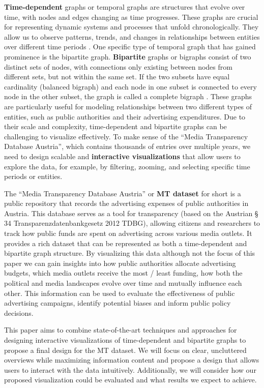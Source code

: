 \documentclass{vgtc}                          %
\begin{document}
\textbf{Time-dependent} graphs or temporal graphs are structures that evolve over time, with nodes and edges changing as time progresses. These graphs are crucial for representing dynamic systems and processes that unfold chronologically. They allow us to observe patterns, trends, and changes in relationships between entities over different time periods \cite{Waldner2020InteractiveEO}.
One specific type of temporal graph that has gained prominence is the bipartite graph. \textbf{Bipartite} graphs or bigraphs consist of two distinct sets of nodes, with connections only existing between nodes from different sets, but not within the same set. If the two subsets have equal cardinality (balanced bigraph) and each node in one subset is connected to every node in the other subset, the graph is called a complete bigraph \cite{diestel2012graph}. These graphs are particularly useful for modeling relationships between two different types of entities, such as public authorities and their advertising expenditures.
Due to their scale and complexity, time-dependent and bipartite graphs can be challenging to visualize effectively. To make sense of the ``Media Transparency Database Austria'', which contains thousands of entries over multiple years, we need to design scalable and \textbf{interactive visualizations} that allow users to explore the data, for example, by filtering, zooming, and selecting specific time periods or entities.

The ``Media Transparency Database Austria'' \cite{dataset} or \textbf{MT dataset} for short is a public repository that records the advertising expenses of public authorities in Austria. This database serves as a tool for transparency (based on the Austrian § 34 Transparenzdatenbankgesetz 2012 TDBG), allowing citizens and researchers to track how public funds are spent on advertising across various media outlets. It provides a rich dataset that can be represented as both a time-dependent and bipartite graph structure. By visualizing this data \textendash{} although not the focus of this paper \textendash{} we can gain insights into how public authorities allocate advertising budgets, which media outlets receive the most / least funding, how both the political and media landscapes evolve over time and mutually influence each other. This information can be used to evaluate the effectiveness of public advertising campaigns, identify potential biases and inform public policy decisions.

\medskip

This paper aims to combine state-of-the-art techniques and approaches for designing interactive visualizations of time-dependent and bipartite graphs to propose a final design for the MT dataset. We will focus on clear, uncluttered overviews while maximizing information content and propose a design that allows users to interact with the data intuitively. Additionally, we will consider how our proposed visualization could be evaluated and what results we expect to achieve.
\end{document}
